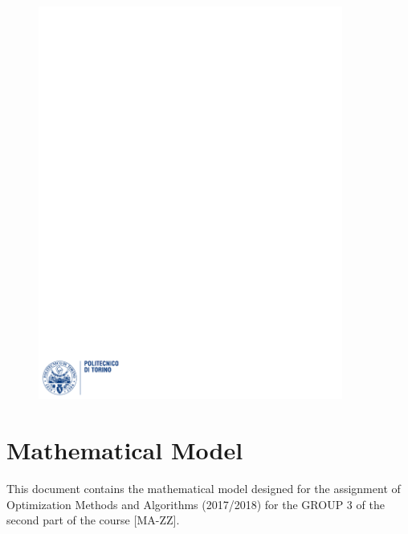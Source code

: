 \documentclass[12pt]{article}
\begin{document}
\begin{figure}
  \centering
  \includegraphics[width=10cm]{images/polito.pdf}
\end{figure}

\maketitle %
\newpage

\section{Mathematical Model}
This document contains the mathematical model designed for the assignment of Optimization Methods and Algorithms (2017/2018) for the GROUP 3 of the second part of the course [MA-ZZ].
\end{document}
